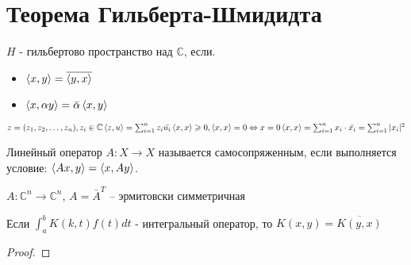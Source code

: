 \section{Теорема Гильберта-Шмидидта}
\begin{definition}
    $H$ - гильбертово пространство над $\mathbb{C}$, если.
    \begin{itemize}
        \item $\left\langle x , y\right\rangle = \overline{\left\langle y , x\right\rangle}$
        \item $\left\langle x , \alpha y\right\rangle = \bar{\alpha}\left\langle x , y\right\rangle$
    \end{itemize}
\end{definition}

\begin{example}
    $z = (z_1, z_2, \dotsc, z_n), z_i \in \mathbb{C} \\
    \left\langle z , u\right\rangle = \sum_{i = 1} ^n z_i \bar{u_i} \\
    \left\langle x , x\right\rangle \geqslant 0, \left\langle x , x\right\rangle = 0 \Leftrightarrow x = 0 \\
    \left\langle x , x\right\rangle = \sum_{i = 1} ^n x_i \cdot \bar{x_i} = \sum_{i = 1} ^n |x_i|^2$
\end{example}

\begin{definition}
    Линейный оператор $A: X \rightarrow X$ называется самосопряженным, 
    если выполняется условие:
    $\left\langle Ax , y\right\rangle = \left\langle x , Ay\right\rangle$.
\end{definition}

\begin{example}
    $A : \mathbb{C}^n \rightarrow \mathbb{C}^n$, 
    $A = \bar{A}^T$ -- эрмитовски симметричная
\end{example}

\begin{statement}
    Если  $\int_a ^b K(k, t) f(t) dt$ - интегральный оператор, 
    то $K(x, y) = \overline{K(y, x)}$
\end{statement}
\begin{proof}
\end{proof}

